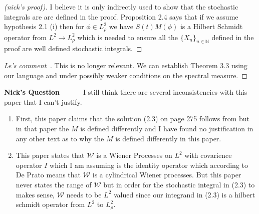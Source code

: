 \documentclass[a4paper,11pt]{article}
\theoremstyle{plain}
\theoremstyle{definition}
\newcounter{NQ}
\newenvironment{NickQuestion}[1][] %
  {\refstepcounter{NQ}
  \begin{mdframed}[backgroundcolor=lightgray]\textbf{Nick's Question \theNQ \: #1~~}~~~\noindent}%
  {\end{mdframed}}
\numberwithin{NQ}{section}
\numberwithin{LQ}{section}
\numberwithin{ZQ}{section}
\begin{document}
\begin{proof}[(nick's proof)]
I believe it is only indirectly used to show that the stochastic integrals are are defined in the proof. Proposition 2.4 says that if we assume hypothesis 2.1 (i) then for $\phi \in L^2_\rho$ we have  $S(t)M(\phi)$ is a Hilbert Schmidt operator from $L^2 \to L^2_\rho$ which is needed to ensure all the $\{X_n\}_{n \in \mathbb N}$ defined in the proof are well defined stochastic integrals.
\end{proof}
\begin{proof}[Le's comment~]
This is no longer relevant. We can establish Theorem 3.3 using our language and under possibly weaker conditions on the spectral measure. 
\end{proof}

\begin{NickQuestion}
I still think there are several inconsistencies with this paper that I can't justify. 
\begin{enumerate}
    \item First, this paper claims that the solution (2.3) on page 275 follows from \cite{PZ95} but in that paper the $M$ is defined differently and I have found no justification in any other text as to why the $M$ is defined differently in this paper. 
    
    \item This paper states that $\mathscr W$ is a Wiener Processes on $L^2$ with covarience operator $I$ which I am assuming is the identity operator which according to De Prato means that $\mathscr W$ is a cylindrical Wiener processes. But this paper never states the range of $\mathscr W$ but in order for the stochastic integral in (2.3) to makes sense, $\mathscr W$ needs to be $L^2$ valued since our integrand in (2.3) is a hilbert schmidt operator from $L^2$ to $L^2_\rho$. 
    

\end{enumerate}
\end{NickQuestion}
\end{document}
